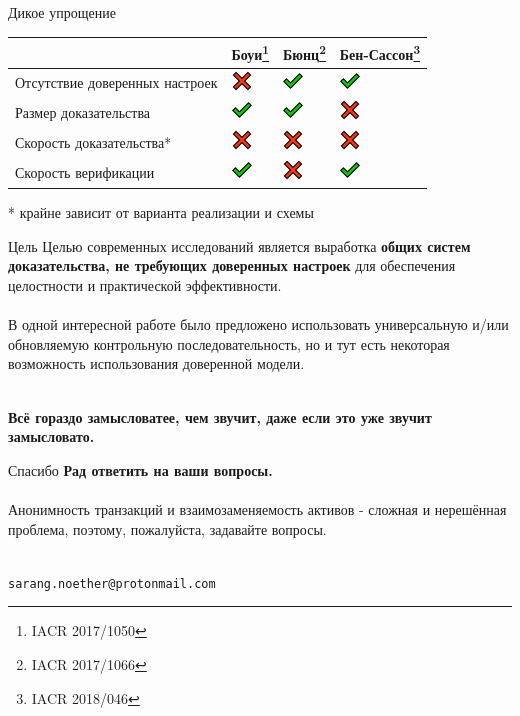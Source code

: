 \documentclass[aspectratio=169]{beamer}
\newcommand{\yicon}{\includegraphics[width=20px]{icon-check.png}}
\newcommand{\nicon}{\includegraphics[width=20px]{icon-cross.png}}
\begin{document}
\begin{frame}{Дикое упрощение}
\begin{table}
\centering
\begin{tabular}{>{\arraybackslash}m{1.0in} >{\arraybackslash}m{0.5in} >{\arraybackslash}m{0.5in} >{\arraybackslash}m{1.0in}}
& Боуи\footnote{IACR 2017/1050} & Бюнц\footnote{IACR 2017/1066} & Бен-Сассон\footnote{IACR 2018/046} \\
\hline
Отсутствие доверенных настроек & \nicon & \yicon & \yicon \\
Размер доказательства & \yicon & \yicon & \nicon \\
Скорость доказательства* & \nicon & \nicon & \nicon \\
Скорость верификации & \yicon & \nicon & \yicon
\end{tabular}
\end{table}
\begin{center}
* крайне зависит от варианта реализации и схемы
\end{center}
\end{frame}


\begin{frame}{Цель}
Целью современных исследований является выработка \textbf{общих систем доказательства, не требующих доверенных настроек} для обеспечения целостности и практической эффективности. \\~\\

В одной интересной работе было предложено использовать универсальную и/или обновляемую контрольную последовательность, но и тут есть некоторая возможность использования доверенной модели. \\~\\

\begin{center}
\textbf{Всё гораздо замысловатее, чем звучит, даже если это уже звучит замысловато.}
\end{center}
\end{frame}


\begin{frame}{Спасибо}
\textbf{Рад ответить на ваши вопросы.} \\~\\

Анонимность транзакций и взаимозаменяемость активов - сложная и нерешённая проблема, поэтому, пожалуйста, задавайте вопросы. \\~\\

\begin{center}
\Large \texttt{sarang.noether@protonmail.com}
\end{center}
\end{frame}
\end{document}

